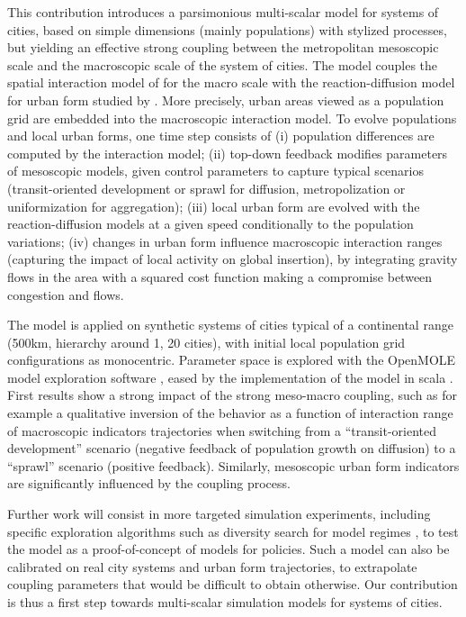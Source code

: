 \documentclass[11pt, a4paper]{article}
\begin{document}
This contribution introduces a parsimonious multi-scalar model for systems of cities, based on simple dimensions (mainly populations) with stylized processes, but yielding an effective strong coupling between the metropolitan mesoscopic scale and the macroscopic scale of the system of cities. The model couples the spatial interaction model of \cite{raimbault2018indirect} for the macro scale with the reaction-diffusion model for urban form studied by \cite{raimbault2018calibration}. More precisely, urban areas viewed as a population grid are embedded into the macroscopic interaction model. To evolve populations and local urban forms, one time step consists of (i) population differences are computed by the interaction model; (ii) top-down feedback modifies parameters of mesoscopic models, given control parameters to capture typical scenarios (transit-oriented development or sprawl for diffusion, metropolization or uniformization for aggregation); (iii) local urban form are evolved with the reaction-diffusion models at a given speed conditionally to the population variations; (iv) changes in urban form influence macroscopic interaction ranges (capturing the impact of local activity on global insertion), by integrating gravity flows in the area with a squared cost function making a compromise between congestion and flows.

The model is applied on synthetic systems of cities typical of a continental range (500km, hierarchy around 1, 20 cities), with initial local population grid configurations as monocentric. Parameter space is explored with the OpenMOLE model exploration software \cite{reuillon2013openmole}, eased by the implementation of the model in scala \cite{model}. First results show a strong impact of the strong meso-macro coupling, such as for example a qualitative inversion of the behavior as a function of interaction range of macroscopic indicators trajectories when switching from a ``transit-oriented development'' scenario (negative feedback of population growth on diffusion) to a ``sprawl'' scenario (positive feedback). Similarly, mesoscopic urban form indicators are significantly influenced by the coupling process.

Further work will consist in more targeted simulation experiments, including specific exploration algorithms such as diversity search for model regimes \cite{reuillon2013openmole}, to test the model as a proof-of-concept of models for policies. Such a model can also be calibrated on real city systems and urban form trajectories, to extrapolate coupling parameters that would be difficult to obtain otherwise. Our contribution is thus a first step towards multi-scalar simulation models for systems of cities.
\end{document}
